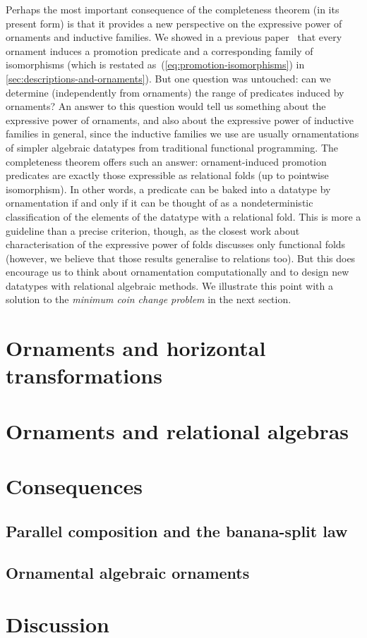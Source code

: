 Perhaps the most important consequence of the completeness theorem (in its present form) is that it provides a new perspective on the expressive power of ornaments and inductive families.
We showed in a previous paper~\cite{Ko-pcOrn} that every ornament induces a promotion predicate and a corresponding family of isomorphisms (which is restated as~(\ref{eq:promotion-isomorphisms}) in \autoref{sec:descriptions-and-ornaments}).
But one question was untouched: can we determine (independently from ornaments) the range of predicates induced by ornaments?
An answer to this question would tell us something about the expressive power of ornaments, and also about the expressive power of inductive families in general, since the inductive families we use are usually ornamentations of simpler algebraic datatypes from traditional functional programming.
The completeness theorem offers such an answer: ornament-induced promotion predicates are exactly those expressible as relational folds (up to pointwise isomorphism).
In other words, a predicate can be baked into a datatype by ornamentation if and only if it can be thought of as a nondeterministic classification of the elements of the datatype with a relational fold.
This is more a guideline than a precise criterion, though, as the closest work about characterisation of the expressive power of folds discusses only functional folds~\cite{Gibbons-kernels}
(however, we believe that those results generalise to relations too).
But this does encourage us to think about ornamentation computationally and to design new datatypes with relational algebraic methods.
We illustrate this point with a solution to the \emph{minimum coin change problem} in the next section.

\section{Ornaments and horizontal transformations}

\section{Ornaments and relational algebras}

\section{Consequences}

\subsection{Parallel composition and the banana-split law}


\subsection{Ornamental algebraic ornaments}

\section{Discussion}

